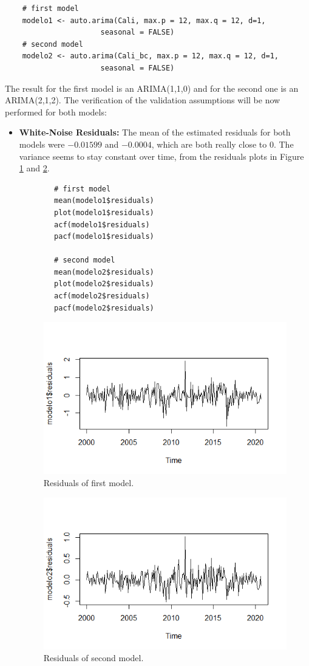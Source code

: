 \documentclass[fleqn]{article}
\begin{document}
\begin{enumerate}
    \begin{verbatim}
    # first model
    modelo1 <- auto.arima(Cali, max.p = 12, max.q = 12, d=1,
                      seasonal = FALSE)
    # second model
    modelo2 <- auto.arima(Cali_bc, max.p = 12, max.q = 12, d=1,
                      seasonal = FALSE)
    \end{verbatim}
    The result for the first model is an ARIMA(1,1,0) and for the second one is an ARIMA(2,1,2). The verification of the validation assumptions will be now performed for both models:
    \begin{itemize}
        \item \textbf{White-Noise Residuals:} The mean of the estimated residuals for both models were $-0.01599$ and $-0.0004$, which are both really close to 0. The variance seems to stay constant over time, from the residuals plots in Figure \ref{fig:mod1res} and \ref{fig:mod2res}.
        \begin{verbatim}
        # first model
        mean(modelo1$residuals)
        plot(modelo1$residuals)
        acf(modelo1$residuals)
        pacf(modelo1$residuals)
        
        # second model
        mean(modelo2$residuals)
        plot(modelo2$residuals)
        acf(modelo2$residuals)
        pacf(modelo2$residuals)
        \end{verbatim}
        \begin{figure}[H]
        \centering
        \includegraphics[width=0.75\linewidth]{figs/mod1res.png}
        \caption{Residuals of first model.}
        \label{fig:mod1res}
        \end{figure}
        \begin{figure}[H]
        \centering
        \includegraphics[width=0.75\linewidth]{figs/mod2res.png}
        \caption{Residuals of second model.}
        \label{fig:mod2res}
        \end{figure}
        

\end{itemize}
\end{enumerate}
\end{document}
